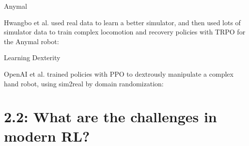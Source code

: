 \documentclass[9pt]{beamer}
\begin{document}
\begin{frame}{Anymal}

Hwangbo et al. used real data to learn a better simulator, and then used lots of simulator data to train complex locomotion and recovery policies with TRPO for the Anymal robot:

\begin{center}
\end{center}

\end{frame}

\begin{frame}{Learning Dexterity}

OpenAI et al. trained policies with PPO to dextrously manipulate a complex hand robot, using sim2real by domain randomization:

\begin{center}
\end{center}


\end{frame}

\section{2.2: What are the challenges in modern RL?}
\end{document}
